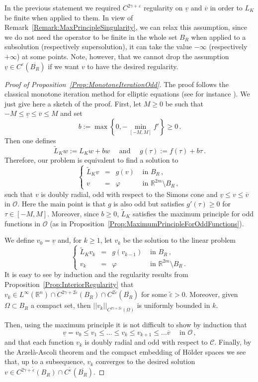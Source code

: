 \documentclass[12pt,reqno]{amsart}
\theoremstyle{definition}
\theoremstyle{remark}
\newcommand{\con}[1]{\mathbb{#1}}
\newcommand{\R}{\con{R}} %
\newcommand{\ccal}{\mathscr{C}}
\newcommand{\ocal}{\mathcal{O}}
\newcommand{\s}{\gamma}
\newcommand\beqc[1]{\left\{\begin{array}{#1}}
\newcommand\eeqc{\end{array} \right.}
\def\PDEsystem{rcll}
\newcommand{\vsub}{\underline{v}}
\newcommand{\vsup}{\overline{v}}
\numberwithin{equation}{section}
\begin{document}
In the previous statement we required $C^{2\s + \varepsilon}$ regularity on $\vsub$ and $\vsup$ in order to $L_K$ be finite when applied to them.
In view of Remark~\ref{Remark:MaxPrincipleSingularity}, we can relax this assumption, since we do not need the operator to be finite in the whole set $B_R$ when applied to a subsolution (respectively supersolution), it can take the value $-\infty$ (respectively $+\infty$) at some points.
Note, however, that we cannot drop the assumption $\vsub\in C^\varepsilon(\overline{B_R})$ if we want $v$  to have the desired regularity.


\begin{proof}[Proof of Proposition~\ref{Prop:MonotoneIterationOdd}]
	The proof follows the classical monotone iteration method for elliptic equations (see for instance \cite{Evans}). We just give here a sketch of the proof. 
	First, let $M \geq 0$ be such that $-M \leq \vsub \leq \vsup \leq M$ and set
	$$
	b := \max \left \{{0, - \min_{[-M,M]}f'}\right \}\geq 0\,.
	$$
	Then one defines 
	$$
	\widetilde{L}_K w := L_Kw + b w 	\quad \text{ and } \quad 	g(\tau) := f(\tau) + b \tau\,.
	$$
	Therefore, our problem is equivalent to find a solution to
	$$
	\beqc{\PDEsystem}
	\widetilde{L}_Kv & = & g(v) & \textrm{ in } B_R\,, \\
	v &=& \varphi &  \textrm{ in } \R^{2m} \setminus B_R\,, 
	\eeqc
	$$
	such that $v$ is doubly radial, odd with respect to the Simons cone and  $\vsub \leq v \leq \vsup$ in $\ocal$. Here the main point is that $g$ is also odd but satisfies $g'(\tau) \geq 0$ for $\tau \in [-M,M]$. Moreover, since $b \geq 0$, $\widetilde{L}_K$ satisfies the maximum principle for odd functions in $\ocal$ (as in Proposition~\ref{Prop:MaximumPrincipleForOddFunctions}).
	
	We define $v_0 = \vsub$ and, for $k\geq 1$, let $v_k$ be the solution to the linear problem
	$$
	\beqc{\PDEsystem}
	\tilde{L}_K v_k & = & g(v_{k-1}) & \textrm{ in } B_R\,, \\
	v_k &=& \varphi &  \textrm{ in } \R^{2m} \setminus B_R\,. 
	\eeqc
	$$
	It is easy to see by induction and the regularity results from Proposition~\ref{Prop:InteriorRegularity} that $v_k\in L^\infty(\R^n) \cap C^{2\s+2\tilde\varepsilon}(B_R)\cap C^{2\tilde\varepsilon}(\overline{B_R})$ for some $\tilde\varepsilon>0$. 
	Moreover, given $\Omega\subset B_R$ a compact set, then $||v_k||_{C^{2\s+2\tilde\varepsilon}(\Omega)}$ is uniformly bounded in $k$.
	
	Then, using the maximum principle it is not difficult to show by induction that 
	$$
	\vsub = v_0 \leq v_1 \leq \ldots \leq v_k \leq v_{k+1} \leq \ldots \vsup \quad \text{ in }\ocal\,,
	$$
	and that each function $v
	_k$ is doubly radial and odd with respect to $\ccal$. Finally, by the Arzelà-Ascoli theorem and the compact embedding of H\"older spaces we see that, up to a subsequence, $v_k$ converges to the desired solution $v\in C^{2\s+\tilde\varepsilon}(B_R)\cap  C^{\tilde\varepsilon}(\overline{B_R}) $.
\end{proof}
\end{document}
